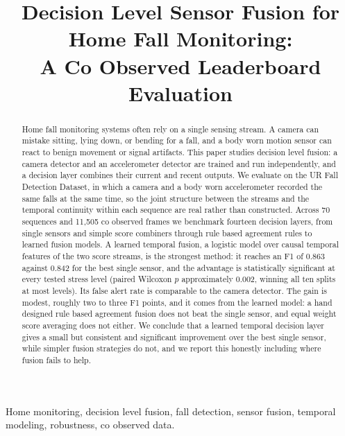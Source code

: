 \documentclass[conference]{IEEEtran}
\begin{document}
\title{Decision Level Sensor Fusion for Home Fall Monitoring:\\
A Co Observed Leaderboard Evaluation}

\author{
}

\maketitle

\begin{abstract}
Home fall monitoring systems often rely on a single sensing stream. A camera
can mistake sitting, lying down, or bending for a fall, and a body worn motion
sensor can react to benign movement or signal artifacts. This paper studies
decision level fusion: a camera detector and an accelerometer detector are
trained and run independently, and a decision layer combines their current and
recent outputs. We evaluate on the UR Fall Detection Dataset, in which a camera
and a body worn accelerometer recorded the same falls at the same time, so the
joint structure between the streams and the temporal continuity within each
sequence are real rather than constructed. Across 70 sequences and 11{,}505 co
observed frames we benchmark fourteen decision layers, from single sensors and
simple score combiners through rule based agreement rules to learned fusion
models. A learned temporal fusion, a logistic model over causal temporal
features of the two score streams, is the strongest method: it reaches an F1 of
0.863 against 0.842 for the best single sensor, and the advantage is
statistically significant at every tested stress level (paired Wilcoxon $p$
approximately 0.002, winning all ten splits at most levels). Its false alert
rate is comparable to the camera detector. The gain is modest, roughly two to
three F1 points, and it comes from the learned model: a hand designed rule based
agreement fusion does not beat the single sensor, and equal weight score
averaging does not either. We conclude that a learned temporal decision layer
gives a small but consistent and significant improvement over the best single
sensor, while simpler fusion strategies do not, and we report this honestly
including where fusion fails to help.
\end{abstract}

\begin{IEEEkeywords}
Home monitoring, decision level fusion, fall detection, sensor fusion, temporal
modeling, robustness, co observed data.
\end{IEEEkeywords}
\end{document}
